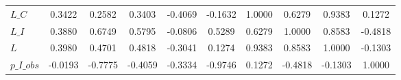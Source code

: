 \begin{center}
\begin{longtable}{lccccccccc}
$L\_C            $	 & 	            0.3422	 & 	            0.2582	 & 	            0.3403	 & 	           -0.4069	 & 	           -0.1632	 & 	            1.0000	 & 	            0.6279	 & 	            0.9383	 & 	            0.1272 \\ 
$L\_I            $	 & 	            0.3880	 & 	            0.6749	 & 	            0.5795	 & 	           -0.0806	 & 	            0.5289	 & 	            0.6279	 & 	            1.0000	 & 	            0.8583	 & 	           -0.4818 \\ 
$L               $	 & 	            0.3980	 & 	            0.4701	 & 	            0.4818	 & 	           -0.3041	 & 	            0.1274	 & 	            0.9383	 & 	            0.8583	 & 	            1.0000	 & 	           -0.1303 \\ 
$p\_I\_obs       $	 & 	           -0.0193	 & 	           -0.7775	 & 	           -0.4059	 & 	           -0.3334	 & 	           -0.9746	 & 	            0.1272	 & 	           -0.4818	 & 	           -0.1303	 & 	            1.0000 \\ 
\end{longtable}
 \end{center}
